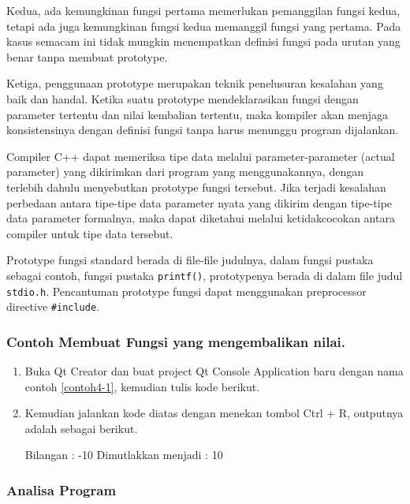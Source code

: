 Kedua, ada kemungkinan fungsi pertama memerlukan pemanggilan fungsi
kedua, tetapi ada juga kemungkinan fungsi kedua memanggil fungsi yang
pertama. Pada kasus semacam ini tidak mungkin menempatkan definisi
fungsi pada urutan yang benar tanpa membuat prototype.

Ketiga, penggunaan prototype merupakan teknik penelusuran kesalahan yang
baik dan handal. Ketika suatu prototype mendeklarasikan fungsi dengan
parameter tertentu dan nilai kembalian tertentu, maka kompiler akan
menjaga konsistensinya dengan definisi fungsi tanpa harus menunggu
program dijalankan.

Compiler C++ dapat memeriksa tipe data melalui parameter-parameter
(actual parameter) yang dikirimkan dari program yang menggunakannya,
dengan terlebih dahulu menyebutkan prototype fungsi tersebut. Jika
terjadi kesalahan perbedaan antara tipe-tipe data parameter nyata yang
dikirim dengan tipe-tipe data parameter formalnya, maka dapat diketahui
melalui ketidakcocokan antara compiler untuk tipe data tersebut.

Prototype fungsi standard berada di file-file judulnya, dalam fungsi
pustaka sebagai contoh, fungsi pustaka \texttt{printf()}, prototypenya
berada di dalam file judul \texttt{stdio.h}. Pencantuman prototype
fungsi dapat menggunakan preprocessor directive \texttt{\#include}.

\subsubsection*{Contoh Membuat Fungsi yang mengembalikan nilai.}

\begin{enumerate}

\item
 Buka Qt Creator dan buat project Qt Console Application baru dengan
 nama contoh \ref{contoh4-1}, kemudian tulis kode berikut.



\item
 Kemudian jalankan kode diatas dengan menekan tombol Ctrl + R, outputnya
 adalah sebagai berikut.
 \begin{lcverbatim}
Bilangan : -10
Dimutlakkan menjadi : 10
 \end{lcverbatim}
\end{enumerate}

\subsubsection*{Analisa Program }

